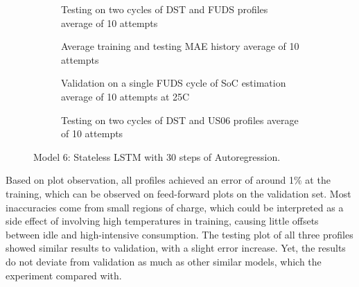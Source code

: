 \begin{figure*}[htbp]
\begin{subfigure}[b]{0.325\textwidth}
        
        \caption{Testing on two cycles of DST and FUDS profiles average of 10 attempts}
    \end{subfigure}
    \begin{subfigure}[b]{0.325\textwidth}
        \centering
        
        \caption{Average training and testing MAE history average of 10 attempts}
    \end{subfigure}
    \hfill
    \begin{subfigure}[b]{0.325\textwidth}
        \centering
        
        \caption{Validation on a single FUDS cycle of SoC estimation average of 10 attempts at 25\textdegree{}C}
    \end{subfigure}
    \hfill
    \begin{subfigure}[b]{0.325\textwidth}
        \centering
        
        \caption{Testing on two cycles of DST and US06 profiles average of 10 attempts}
    \end{subfigure}
    \caption{Model 6: Stateless LSTM with 30 steps of Autoregression.}
    \label{fig:Model-6res}
\end{figure*}

%
%
Based on plot observation, all profiles achieved an error of around 1\% at the training, which can be observed on feed-forward plots on the validation set.
Most inaccuracies come from small regions of charge, which could be interpreted as a side effect of involving high temperatures in training, causing little offsets between idle and high-intensive consumption.
The testing plot of all three profiles showed similar results to validation, with a slight error increase.
Yet, the results do not deviate from validation as much as other similar models,  which the experiment compared with.


